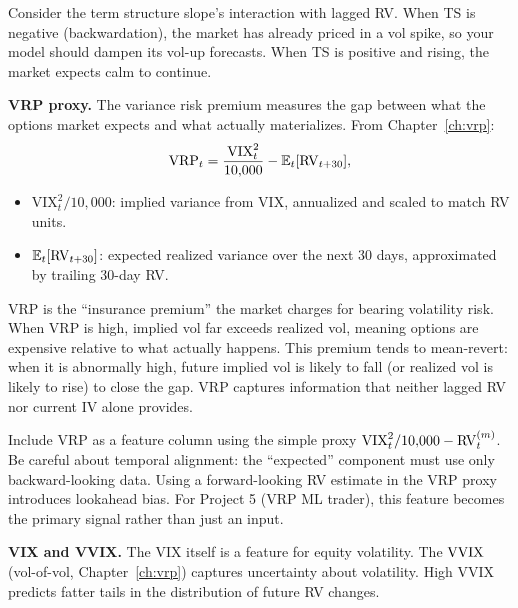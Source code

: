 \begin{projectconnection}
Consider the term structure slope's interaction with lagged RV. When TS is negative (backwardation), the market has already priced in a vol spike, so your model should dampen its vol-up forecasts. When TS is positive and rising, the market expects calm to continue.
\end{projectconnection}

\textbf{VRP proxy.}
The variance risk premium measures the gap between what the options market expects and what actually materializes. From Chapter~\ref{ch:vrp}:
\begin{equation}\label{eq:vrp-feat}
\operatorname{VRP}_t = \frac{\text{VIX}_t^2}{10{,}000} - \mathbb{E}_t[\operatorname{RV}_{t+30}],
\end{equation}
\begin{itemize}[nosep]
  \item $\text{VIX}_t^2 / 10{,}000$: implied variance from VIX, annualized and scaled to match RV units.
  \item $\mathbb{E}_t[\operatorname{RV}_{t+30}]$: expected realized variance over the next 30 days, approximated by trailing 30-day RV.
\end{itemize}

\begin{intuition}
VRP is the ``insurance premium'' the market charges for bearing volatility risk. When VRP is high, implied vol far exceeds realized vol, meaning options are expensive relative to what actually happens. This premium tends to mean-revert: when it is abnormally high, future implied vol is likely to fall (or realized vol is likely to rise) to close the gap. VRP captures information that neither lagged RV nor current IV alone provides.
\end{intuition}

\begin{projectconnection}
Include VRP as a feature column using the simple proxy $\text{VIX}_t^2/10{,}000 - \operatorname{RV}_t^{(m)}$. Be careful about temporal alignment: the ``expected'' component must use only backward-looking data. Using a forward-looking RV estimate in the VRP proxy introduces lookahead bias. For Project 5 (VRP ML trader), this feature becomes the primary signal rather than just an input.
\end{projectconnection}

\textbf{VIX and VVIX.}
The VIX itself is a feature for equity volatility.
The $\operatorname{VVIX}$ (vol-of-vol, Chapter~\ref{ch:vrp}) captures uncertainty about volatility.
High VVIX predicts fatter tails in the distribution of future RV changes.

